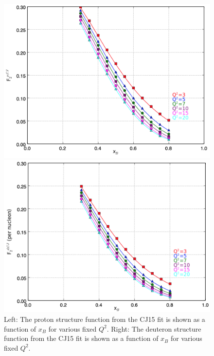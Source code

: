 \documentclass[oneside]{article}
\begin{document}
\begin{figure}
\begin{minipage}{0.5\textwidth}
 \includegraphics[width=\textwidth]{plots/p_CJ.png}
\end{minipage}\hfill\begin{minipage}{0.5\textwidth}
 \includegraphics[width=\textwidth]{plots/d_CJ.png}
 \end{minipage}
  \caption[Proton and deuteron from CJ15]{Left: The proton structure function from the CJ15 fit is shown as a function of $x_B$ for various fixed $Q^2$. Right: The deuteron structure function from the CJ15 fit is shown as a function of $x_B$ for various fixed $Q^2$.}
  \label{fig:pd_CJ15}
\end{figure} 
 
\end{document}
